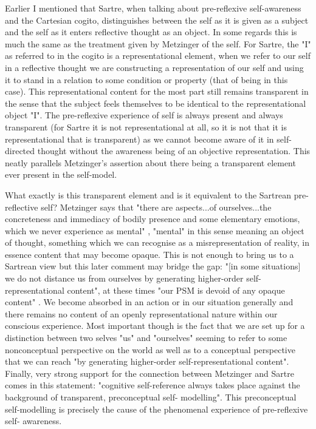 Earlier I mentioned that Sartre, when talking about pre-reflexive self-awareness and the Cartesian cogito, distinguishes between the self as it is given as a subject and the self as it enters reflective thought as an object. In some regards this is much the same as the treatment given by Metzinger of the self. For Sartre, the "I" as referred to in the cogito is a representational element, when we refer to our self in a reflective thought we are constructing a representation of our self and using it to stand in a relation to some condition or property (that of being in this case). This representational content for the most part still remains transparent in the sense that the subject feels themselves to be identical to the representational object "I". The pre-reflexive experience of self is always present and always transparent (for Sartre it is not representational at all, so it is not that it is representational that is transparent) as we cannot become aware of it in self-directed thought without the awareness being of an objective representation. This neatly parallels Metzinger's assertion about there being a transparent element ever present in the self-model.

What exactly is this transparent element and is it equivalent to the Sartrean pre-reflective self? Metzinger says that "there are aspects...of ourselves...the concreteness and immediacy of bodily presence and some elementary emotions, which we never experience as mental" \cite[p. 332]{metzinger2003}, "mental" in this sense meaning an object of thought, something which we can recognise as a misrepresentation of reality, in essence content that may become opaque. This is not enough to bring us to a Sartrean view but this later comment may bridge the gap: "[in some situations] we do not distance us from ourselves by generating higher-order self-representational content", at these times "our PSM is devoid of any opaque content" \cite[p. 333]{metzinger2003}. We become absorbed in an action or in our situation generally and there remains no content of an openly representational nature within our conscious experience. Most important though is the fact that we are set up for a distinction between two selves "us" and "ourselves" seeming to refer to some nonconceptual perspective on the world as well as to a conceptual perspective that we can reach "by generating higher-order self-representational content". Finally, very strong support for the connection between Metzinger and Sartre comes in this statement: "cognitive self-reference always takes place against the background of transparent, preconceptual self- modelling". This preconceptual self-modelling is precisely the cause of the phenomenal experience of pre-reflexive self- awareness.

